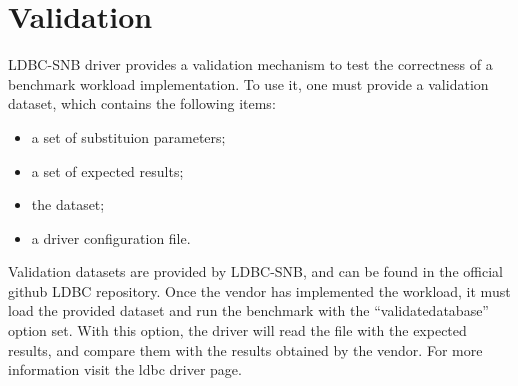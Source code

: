 \section{Validation}

LDBC-SNB driver provides a validation mechanism to test the correctness of a benchmark 
workload implementation. To use it, one must provide a validation dataset, which contains
the following items:
\begin{itemize}
    \item a set of substituion parameters;
    \item a set of expected results;
    \item the dataset;
    \item a driver configuration file.
\end{itemize}

Validation datasets are provided by LDBC-SNB, and can be found in the official github 
LDBC repository. 
Once the vendor has implemented the workload, it must load the provided dataset and run
the benchmark with the ``validatedatabase'' option set. With this option, the
driver will read the file with the expected results, and compare them with the results
obtained by the vendor. For more information visit the ldbc driver page.
